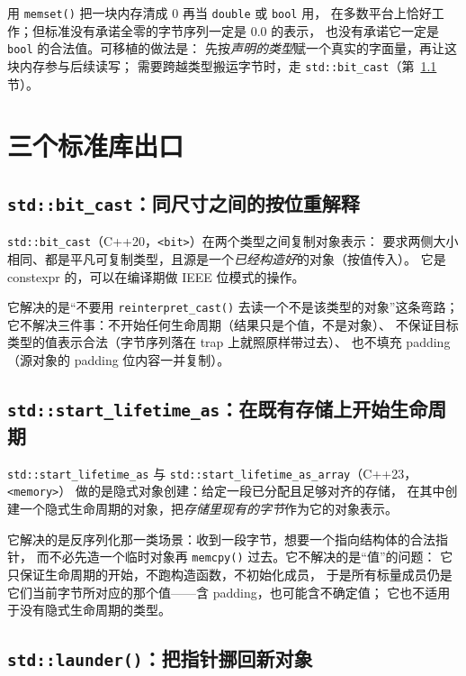 \documentclass[12pt,a4paper,fontset=fandol]{ctexbook}
\newcommand{\cpp}[1]{C++#1}
\newcommand{\Fn}[1]{\texttt{#1()}}
\newcommand{\Tp}[1]{\texttt{#1}}
\newcommand{\Bk}{\discretionary{}{}{}}
\newcommand{\Hdr}[1]{\texttt{<#1>}}
\newcommand{\Feat}[1]{\texttt{#1}}
\begin{document}
\begin{warning}[title={memset 清零不等于造出一个合法值}]
用 \Fn{memset} 把一块内存清成 0 再当 \Tp{double} 或 \Tp{bool} 用，
在多数平台上恰好工作；但标准没有承诺全零的字节序列一定是 0.0 的表示，
也没有承诺它一定是 \Tp{bool} 的合法值。可移植的做法是：
先按\emph{声明的类型}赋一个真实的字面量，再让这块内存参与后续读写；
需要跨越类型搬运字节时，走 \Tp{std::bit\_cast}（第~\ref{sec:ub04-bit-cast} 节）。
\end{warning}

\section{三个标准库出口}\label{sec:ub04-library-escapes}

\subsection{\Tp{std::bit\_cast}：同尺寸之间的按位重解释}\label{sec:ub04-bit-cast}

\Feat{std::bit\_cast}（\cpp{20}，\Hdr{bit}）在两个类型之间复制对象表示：
要求两侧大小相同、都是平凡可复制类型，且源是一个\emph{已经构造好}的对象（按值传入）。
它是 constexpr 的，可以在编译期做 IEEE 位模式的操作。

它解决的是“不要用 \Fn{reinterpret\_cast} 去读一个不是该类型的对象”这条弯路；
它不解决三件事：不开始任何生命周期（结果只是个值，不是对象）、
不保证目标类型的值表示合法（字节序列落在 trap 上就照原样带过去）、
也不填充 padding（源对象的 padding 位内容一并复制）。

\subsection{\Tp{std::start\_lifetime\_as}：在既有存储上开始生命周期}\label{sec:ub04-start-lifetime}

\Tp{std::start{\Bk}\_lifetime{\Bk}\_as} 与
\Tp{std::start{\Bk}\_lifetime{\Bk}\_as{\Bk}\_array}（\cpp{23}，\Hdr{memory}）
做的是隐式对象创建：给定一段已分配且足够对齐的存储，
在其中创建一个隐式生命周期的对象，把\emph{存储里现有的字节}作为它的对象表示。

它解决的是反序列化那一类场景：收到一段字节，想要一个指向结构体的合法指针，
而不必先造一个临时对象再 \Fn{memcpy} 过去。它不解决的是“值”的问题：
它只保证生命周期的开始，不跑构造函数，不初始化成员，
于是所有标量成员仍是它们当前字节所对应的那个值——含 padding，也可能含不确定值；
它也不适用于没有隐式生命周期的类型。

\subsection{\Fn{std::launder}：把指针挪回新对象}\label{sec:ub04-launder}
\end{document}
